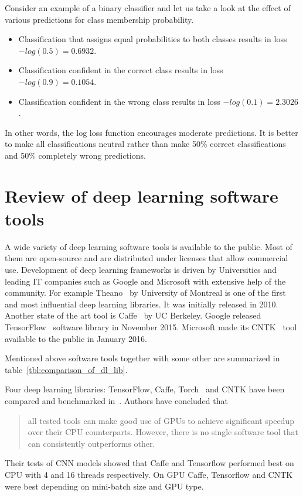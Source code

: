 \documentclass[a4paper, 11pt, table]{article}
\begin{document}
Consider an example of a binary classifier and let us take a look at the effect of various predictions for class membership probability. 
\begin{itemize}
\item Classification that assigns equal probabilities to both classes results in loss $-log(0.5)=0.6932$.  

\item Classification confident in the correct class results in loss $-log(0.9)=0.1054$.

\item Classification confident in the wrong class results in loss $-log(0.1)=2.3026$. 
\end{itemize}

In other words, the log loss function encourages moderate predictions. It is better to make all classifications neutral rather than make 50\% correct classifications and 50\% completely wrong predictions.

\section{Review of deep learning software tools}

A wide variety of deep learning software tools is available to the public. Most of them are open-source and are distributed under licenses that allow commercial use. Development of deep learning frameworks is driven by Universities and leading IT companies such as Google and Microsoft with extensive help of the community. For example Theano~\cite{2016arXiv160502688short} by University of Montreal is one of the first and most influential deep learning libraries. It was initially released in 2010. Another state of the art tool is Caffe~\cite{jia2014caffe} by UC Berkeley. Google released TensorFlow~\cite{tensorflow2015-whitepaper} software library in November 2015. Microsoft made its CNTK~\cite{cntk} tool available to the public in January 2016.

Mentioned above software tools together with some other are summarized in table~\ref{tbl:comparison_of_dl_lib}. 

Four deep learning libraries: TensorFlow, Caffe, Torch~\cite{Collobert_NIPSWORKSHOP_2011} and CNTK have been compared and benchmarked in~\cite{DBLP:journals/corr/ShiWXC16}. Authors have concluded that \blockquote{all tested tools can make good use of GPUs to achieve significant speedup over their CPU counterparts. However, there is  no  single  software  tool  that  can  consistently  outperforms other.} Their tests of CNN models showed that Caffe and Tensorflow performed best on CPU with 4 and 16 threads respectively. On GPU Caffe, Tensorflow and CNTK were best depending on mini-batch size and GPU type. 
\end{document}
